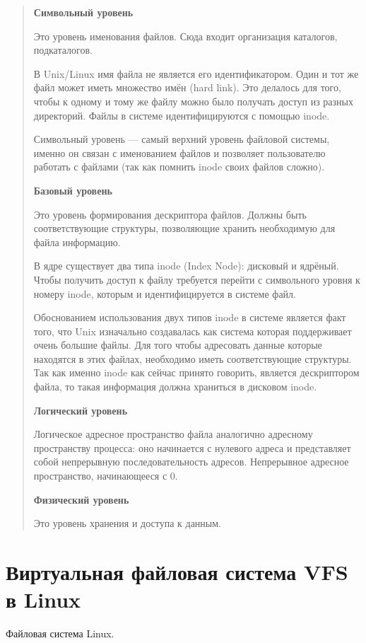 \begin{quote}
\textbf{Символьный уровень}

Это уровень именования файлов. Сюда входит организация каталогов, подкаталогов.

В Unix/Linux имя файла не является его идентификатором. Один и тот же файл может иметь множество имён (hard link). Это делалось для того, чтобы к одному и тому же файлу можно было получать доступ из разных директорий. Файлы в системе идентифицируются с помощью inode.

Символьный уровень — самый верхний уровень файловой системы, именно он связан с именованием файлов и позволяет пользователю работать с файлами (так как помнить inode своих файлов сложно).

\textbf{Базовый уровень}


Это уровень формирования дескриптора файлов. Должны быть соответствующие структуры, позволяющие хранить необходимую для файла информацию.

В ядре существует два типа inode (Index Node): дисковый и ядрёный. Чтобы получить доступ к файлу требуется перейти с символьного уровня к номеру inode, которым и идентифицируется в системе файл.

Обоснованием использования двух типов inode в системе является факт того, что Unix изначально создавалась как система которая поддерживает очень большие файлы. Для того чтобы адресовать данные которые находятся в этих файлах, необходимо иметь соответствующие структуры. Так как именно inode как сейчас принято говорить, является дескриптором файла, то такая информация должна храниться в дисковом inode.

\textbf{Логический уровень}

Логическое адресное пространство файла аналогично адресному пространству процесса: оно начинается с нулевого адреса и представляет собой непрерывную последовательность адресов. Непрерывное адресное пространство, начинающееся с 0.

\textbf{Физический уровень}

Это уровень хранения и доступа к данным.

\end{quote}

\section{Виртуальная файловая система VFS в Linux}

Файловая система Linux.

